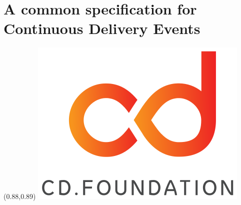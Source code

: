 \documentclass[aspectratio=169,11pt,hyperref={colorlinks=true}]{beamer}
\begin{document}
\section[CDEvents]{A common specification for Continuous Delivery Events}

\begin{sectionwithpicmediumcentral}{
  \begin{textblock*}{0.07\paperwidth}(0.88\paperwidth,0.89\paperheight)
    \includegraphics[width=0.07\paperwidth]{img/cdf-stacked-color.png}
  \end{textblock*}
}
\end{sectionwithpicmediumcentral}
\end{document}
